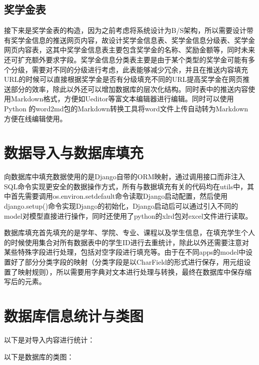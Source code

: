 \subsection{奖学金表}

接下来是奖学金表的构造，因为之前考虑将系统设计为B/S架构，所以需要设计带有奖学金信息的推送网页内容，故设计奖学金信息表、奖学金信息分级表、奖学金网页内容表，这其中奖学金信息表主要包含奖学金的名称、奖励金额等，同时未来还可扩充额外要求字段。奖学金信息分类表主要是由于某个类型的奖学金可能有多个分级，需要对不同的分级进行考虑，此表能够减少冗余，并且在推送内容填充URL的时候可以直接根据奖学金是否有分级填充不同的URL提高奖学金在网页推送部分的效率，除此以外还可以增加数据库的层次化结构。同时表中的推送内容使用Markdown格式，方便如Ueditor等富文本编辑器进行编辑。同时可以使用Python 的word2md包的Markdown转换工具将word文件上传自动转为Markdown方便在线编辑使用。

\section{数据导入与数据库填充}

向数据库中填充数据使用的是Django自带的ORM映射，通过调用接口而非注入SQL命令实现更安全的数据操作方式，所有与数据填充有关的代码均在utils中，其中首先需要调用os.environ.setdefault命令读取Django启动配置，然后使用django.setup()命令实现Django的初始化，Django启动后可以通过引入不同的model对模型直接进行操作，同时还使用了python的xlrd包对excel文件进行读取。

数据库填充首先填充的是学年、学院、专业、课程以及学生信息，在填充学生个人的时候使用集合对所有数据表中的学生ID进行去重统计，除此以外还需要注意对某些特殊字段进行处理，包括对空字段进行填充等。由于在不同apps的model中设置好了部分分类字段的映射（分类字段是以CharField的形式进行保存，用元组设置了映射规则），所以需要用字典对文本进行处理与转换，最终在数据库中保存缩写后的元素。

\section{数据库信息统计与类图}

以下是对导入内容进行统计：

以下是数据库的类图：

